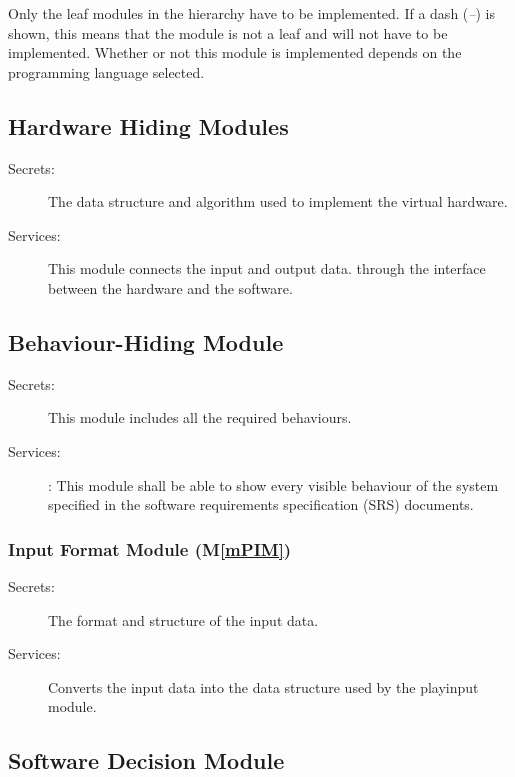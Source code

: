 \documentclass[12pt, titlepage]{article}
\newcommand{\mref}[1]{M\ref{#1}}
\begin{document}
Only the leaf modules in the
hierarchy have to be implemented. If a dash (\emph{--}) is shown, this means
that the module is not a leaf and will not have to be implemented. Whether or
not this module is implemented depends on the programming language
selected.


\subsection{Hardware Hiding Modules }

\begin{description}
\item[Secrets:]The data structure and algorithm used to implement the virtual hardware.

\item[Services:]This module connects the input and output data. through the interface between the hardware and the software.
\end{description}

\subsection{Behaviour-Hiding Module}

\begin{description}
\item[Secrets:]This module includes all the required behaviours.
\item[Services:]: This module shall be able to show every visible behaviour of the system specified in the software requirements specification (SRS) documents.
\end{description}


\subsubsection{Input Format Module (\mref{mPIM})}

\begin{description}
\item[Secrets:]The format and structure of the input data.

\item[Services:]Converts the input data into the data structure used by the playinput
module.
\end{description}

\subsection{Software Decision Module}
\end{document}
